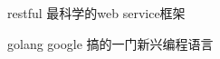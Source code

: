 \begin{denotation}

\item[restful] 最科学的web service框架
\item[golang] google 搞的一门新兴编程语言
\end{denotation}
